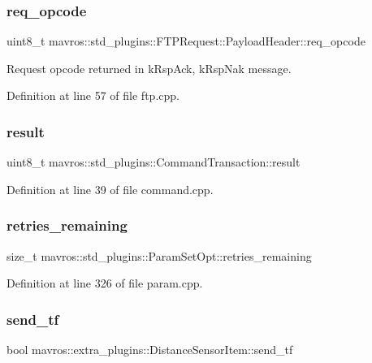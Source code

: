 \subsubsection{\texorpdfstring{req\_opcode}{req\_opcode}}
{\footnotesize\ttfamily uint8\+\_\+t mavros\+::std\+\_\+plugins\+::\+F\+T\+P\+Request\+::\+Payload\+Header\+::req\+\_\+opcode}



Request opcode returned in k\+Rsp\+Ack, k\+Rsp\+Nak message. 



Definition at line 57 of file ftp.\+cpp.

\mbox{\label{group__plugin_ga2a8b012d390601f0b01d311c3c733d7a}} 
\subsubsection{\texorpdfstring{result}{result}}
{\footnotesize\ttfamily uint8\+\_\+t mavros\+::std\+\_\+plugins\+::\+Command\+Transaction\+::result}



Definition at line 39 of file command.\+cpp.

\mbox{\label{group__plugin_ga248de6628eca54d86cc6b52623434639}} 
\subsubsection{\texorpdfstring{retries\_remaining}{retries\_remaining}}
{\footnotesize\ttfamily size\+\_\+t mavros\+::std\+\_\+plugins\+::\+Param\+Set\+Opt\+::retries\+\_\+remaining}



Definition at line 326 of file param.\+cpp.

\mbox{\label{group__plugin_ga3488a32205974b427d937ca524aa3aa0}} 
\subsubsection{\texorpdfstring{send\_tf}{send\_tf}}
{\footnotesize\ttfamily bool mavros\+::extra\+\_\+plugins\+::\+Distance\+Sensor\+Item\+::send\+\_\+tf}



